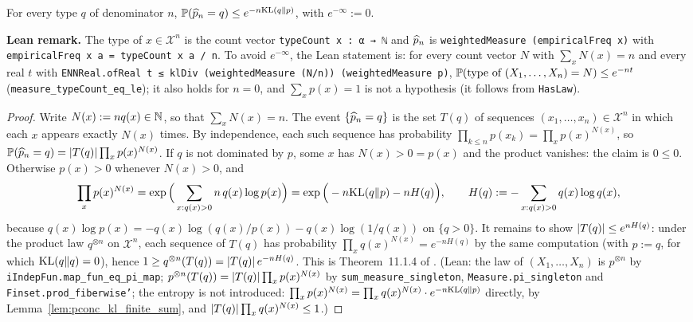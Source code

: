 \begin{lemma}\label{lem:type_prob_le}
\leanok
For every type $q$ of denominator $n$,
$\mathbb{P}(\widehat{p}_n = q) \le e^{-n \mathrm{KL}(q \| p)}$, with $e^{-\infty} := 0$.
\end{lemma}

\textbf{Lean remark.} The type of $x \in \mathcal X^n$ is the count vector
\texttt{typeCount x : α → ℕ} and $\widehat{p}_n$ is \texttt{weightedMeasure (empiricalFreq x)} with
\texttt{empiricalFreq x a = typeCount x a / n}. To avoid $e^{-\infty}$, the Lean statement is: for
every count vector $N$ with $\sum_x N(x) = n$ and every real $t$ with
\texttt{ENNReal.ofReal t ≤ klDiv (weightedMeasure (N/n)) (weightedMeasure p)},
$\mathbb{P}(\text{type of } (X_1, \dots, X_n) = N) \le e^{-nt}$ (\texttt{measure\_typeCount\_eq\_le}); it
also holds for $n = 0$, and $\sum_x p(x) = 1$ is not a hypothesis (it follows from
\texttt{HasLaw}).

\begin{proof}
\leanok
Write $N(x) := n q(x) \in \mathbb{N}$, so that $\sum_x N(x) = n$. The event $\{\widehat{p}_n = q\}$ is the
set $T(q)$ of sequences $(x_1, \dots, x_n) \in \mathcal X^n$ in which each $x$ appears exactly
$N(x)$ times. By independence, each such sequence has probability
$\prod_{k \le n} p(x_k) = \prod_x p(x)^{N(x)}$, so $\mathbb{P}(\widehat{p}_n = q) = \lvert T(q) \rvert \prod_x p(x)^{N(x)}$.
If $q$ is not dominated by $p$, some $x$ has $N(x) > 0 = p(x)$ and the product vanishes: the
claim is $0 \le 0$. Otherwise $p(x) > 0$ whenever $N(x) > 0$, and
\[
  \prod_x p(x)^{N(x)} = \exp\Big(\sum_{x : q(x) > 0} n\, q(x) \log p(x)\Big)
  = \exp\Big(-n \mathrm{KL}(q \| p) - n H(q)\Big), \qquad H(q) := -\sum_{x : q(x) > 0} q(x) \log q(x),
\]
because $q(x) \log p(x) = -q(x) \log(q(x)/p(x)) - q(x)\log(1/q(x))$ on $\{q > 0\}$. It remains to
show $\lvert T(q) \rvert \le e^{n H(q)}$: under the product law $q^{\otimes n}$ on $\mathcal X^n$, each
sequence of $T(q)$ has probability $\prod_x q(x)^{N(x)} = e^{-n H(q)}$ by the same computation
(with $p := q$, for which $\mathrm{KL}(q \| q) = 0$), hence
$1 \ge q^{\otimes n}(T(q)) = \lvert T(q) \rvert\, e^{-n H(q)}$. This is Theorem~11.1.4 of
\cite{cover2006elements}. (Lean: the law of $(X_1, \dots, X_n)$ is $p^{\otimes n}$ by
\texttt{iIndepFun.map\_fun\_eq\_pi\_map}; $p^{\otimes n}(T(q)) = \lvert T(q) \rvert \prod_x p(x)^{N(x)}$ by
\texttt{sum\_measure\_singleton}, \texttt{Measure.pi\_singleton} and \texttt{Finset.prod\_fiberwise'};
the entropy is not introduced: $\prod_x p(x)^{N(x)} = \prod_x q(x)^{N(x)} \cdot e^{-n\mathrm{KL}(q\|p)}$
directly, by Lemma~\ref{lem:pconc_kl_finite_sum}, and $\lvert T(q) \rvert \prod_x q(x)^{N(x)} \le 1$.)
\end{proof}

